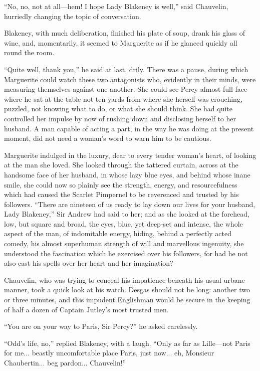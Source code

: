\documentclass[paper=5.5in:8.5in,BCOR=7mm,twoside,DIV=calc,12pt,usegeometry,chapterprefix,endperiod,headings=big]{scrbook}
\begin{document}
\enquote{No, no, not at all---hem! I hope Lady Blakeney is well,} said Chauvelin, hurriedly changing the topic of conversation.

Blakeney, with much deliberation, finished his plate of soup, drank his glass of wine, and, momentarily, it seemed to Marguerite as if he glanced quickly all round the room.

\enquote{Quite well, thank you,} he said at last, drily. There was a pause, during which Marguerite could watch these two antagonists who, evidently in their minds, were measuring themselves against one another. She could see Percy almost full face where he sat at the table not ten yards from where she herself was crouching, puzzled, not knowing what to do, or what she should think. She had quite controlled her impulse by now of rushing down and disclosing herself to her husband. A man capable of acting a part, in the way he was doing at the present moment, did not need a woman's word to warn him to be cautious.

Marguerite indulged in the luxury, dear to every tender woman's heart, of looking at the man she loved. She looked through the tattered curtain, across at the handsome face of her husband, in whose lazy blue eyes, and behind whose inane smile, she could now so plainly see the strength, energy, and resourcefulness which had caused the Scarlet Pimpernel to be reverenced and trusted by his followers. \enquote{There are nineteen of us ready to lay down our lives for your husband, Lady Blakeney,} Sir Andrew had said to her; and as she looked at the forehead, low, but square and broad, the eyes, blue, yet deep-set and intense, the whole aspect of the man, of indomitable energy, hiding, behind a perfectly acted comedy, his almost superhuman strength of will and marvellous ingenuity, she understood the fascination which he exercised over his followers, for had he not also cast his spells over her heart and her imagination?

Chauvelin, who was trying to conceal his impatience beneath his usual urbane manner, took a quick look at his watch. Desgas should not be long: another two or three minutes, and this impudent Englishman would be secure in the keeping of half a dozen of Captain Jutley's most trusted men.

\enquote{You are on your way to Paris, Sir Percy?} he asked carelessly.

\enquote{Odd's life, no,} replied Blakeney, with a laugh. \enquote{Only as far as Lille---not Paris for me... beastly uncomfortable place Paris, just now... eh, Monsieur Chaubertin... beg pardon... Chauvelin!}
\end{document}
